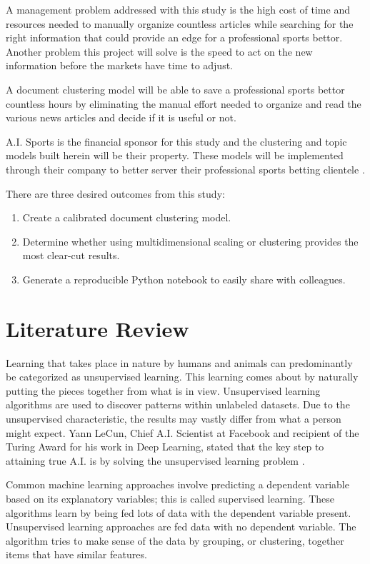 \documentclass[5p,authoryear]{elsarticle}
\begin{document}
A management problem addressed with this study is the high cost of time and resources needed to manually organize countless articles while searching for the right information that could provide an edge for a professional sports bettor. 
Another problem this project will solve is the speed to act on the new information before the markets have time to adjust. 

A document clustering model will be able to save a professional sports bettor countless hours by eliminating the manual effort needed to organize and read the various news articles and decide if it is useful or not. 

A.I. Sports is the financial sponsor for this study and the clustering and topic models built herein will be their property. These models will be implemented through their company to better server their professional sports betting clientele \citep{aisports}. 

There are three desired outcomes from this study: 
\begin{enumerate}
 \item Create a calibrated document clustering model.
 \item Determine whether using multidimensional scaling or clustering provides the most clear-cut results.
 \item Generate a reproducible Python notebook to easily share with colleagues. 
\end{enumerate} 


\section{Literature Review}\label{lit_rev}

Learning that takes place in nature by humans and animals can predominantly be categorized as unsupervised learning.
This learning comes about by naturally putting the pieces together from what is in view. 
Unsupervised learning algorithms are used to discover patterns within unlabeled datasets. 
Due to the unsupervised characteristic, the results may vastly differ from what a person might expect.
Yann LeCun, Chief A.I. Scientist at Facebook and recipient of the Turing Award for his work in Deep Learning, stated that the key step to attaining true A.I. is by solving the unsupervised learning problem \citep{handsOn}. 

Common machine learning approaches involve predicting a dependent variable based on its explanatory variables; this is called supervised learning. 
These algorithms learn by being fed lots of data with the dependent variable present. 
Unsupervised learning approaches are fed data with no dependent variable.
The algorithm tries to make sense of the data by grouping, or clustering, together items that have similar features.
\end{document}
